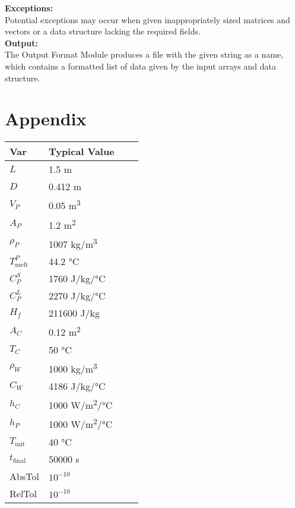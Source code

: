 \documentclass[12pt]{article}
\begin{document}
\noindent \textbf{Exceptions:}\\
Potential exceptions may occur when given inappropriately sized
matrices and vectors or a data structure lacking the required fields.\\

\noindent \textbf{Output:}\\
The Output Format Module produces a file with the given string as a name, which contains a formatted list of data given by the input arrays and data structure.


\section{Appendix}
\begin{table}[!h]
\caption{Standard Input Variables} \label{TblInputVar}
\renewcommand{\arraystretch}{1.2}
\noindent \begin{longtable*}{l l l c} 
  \toprule
  \textbf{Var} & \textbf{Typical Value}\\
  \midrule 
  $L$	& 1.5 \si[per-mode=symbol]	{\metre}
  \\
  $D$	& 0.412 \si[per-mode=symbol] {\metre}	
  \\
  $V_P$ & 0.05 \si[per-mode=symbol] {\cubic\metre}	
  \\
  $A_P$ & 1.2 \si[per-mode=symbol] {\square\metre}	
  \\
  $\rho_P$ & 1007 \si[per-mode=symbol] {\kilogram\per\cubic\metre}
  \\
  $T_\text{melt}^{P}$ &	44.2 \si[per-mode=symbol] {\celsius} 
  \\
  $C_P^S$ & 1760 \si[per-mode=symbol] {\joule\per\kilo\gram\per\celsius}
  \\
  $C_P^L$ & 2270 \si[per-mode=symbol] {\joule\per\kilo\gram\per\celsius} 
  \\
  $H_f$ & 211600 \si[per-mode=symbol] {\joule\per\kilo\gram} & 
  \\
  $A_C$ & 0.12 \si[per-mode=symbol] {\square\metre}
  \\
  $T_C$	& 50 \si[per-mode=symbol] {\celsius}
  \\
  $\rho_W$ & 1000 \si[per-mode=symbol] {\kilo\gram\per\cubic\metre} 
  \\
  $C_W$ & 4186 \si[per-mode=symbol] {\joule\per\kilo\gram\per\celsius}
  \\
  $h_C$ & 1000 \si[per-mode=symbol] {\watt\per\square\metre\per\celsius}
  \\
  $h_P$ & 1000 \si[per-mode=symbol] {\watt\per\square\metre\per\celsius} 
  \\
  $T_\text{init}$ & 40 \si[per-mode=symbol] {\celsius} 
  \\
  $t_\text{final}$ & 50000 \si[per-mode=symbol] {\second} 
  \\
  AbsTol & $10^{-10}$
  \\
  RelTol & $10^{-10}$
  \\
  \bottomrule
\end{longtable*}
\end{table}
\end{document}
